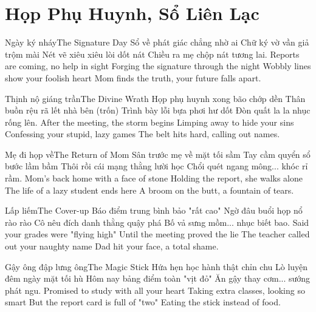 \chapter{Họp Phụ Huynh, Sổ Liên Lạc}

\begin{tutuyetbox}{Ngày ký nháy}{The Signature Day}
Sổ về phát giác chẳng nhờ ai
Chữ ký vờ vần giả trộm mài
Nét vẽ xiêu xiêu lòi dốt nát
Chiều ra mẹ chộp nát tương lai.
\tcblower
Reports are coming, no help in sight 
Forging the signature through the night 
Wobbly lines show your foolish heart 
Mom finds the truth, your future falls apart.
\end{tutuyetbox}

\begin{tutuyetbox}{Thịnh nộ giáng trần}{The Divine Wrath}
Họp phụ huynh xong bão chớp dền
Thân buồn rệu rã lết nhà bên (trốn)
Trình bày lỗi bựa phơi hư dốt
Đòn quất la la nhục rống lên.
\tcblower
After the meeting, the storm begins 
Limping away to hide your sins 
Confessing your stupid, lazy games 
The belt hits hard, calling out names.
\end{tutuyetbox}

\begin{tutuyetbox}{Mẹ đi họp về}{The Return of Mom}
Sân trước mẹ về mặt tối sầm
Tay cầm quyển sổ bước lầm bầm
Thôi rồi cái mạng thằng lười học
Chổi quét ngang mông... khóc rỉ rầm.
\tcblower
Mom's back home with a face of stone
Holding the report, she walks alone
The life of a lazy student ends here
A broom on the butt, a fountain of tears.
\end{tutuyetbox}

\begin{tutuyetbox}{Lấp liếm}{The Cover-up}
Báo điểm trung bình bảo "rất cao"
Ngờ đâu buổi họp nổ rào rào
Cô nêu đích danh thằng quậy phá
Bố vả sưng mồm... nhục biết bao.
\tcblower
Said your grades were "flying high"
Until the meeting proved the lie
The teacher called out your naughty name
Dad hit your face, a total shame.
\end{tutuyetbox}

\begin{tutuyetbox}{Gậy ông đập lưng ông}{The Magic Stick}
Hứa hẹn học hành thật chỉn chu
Lò luyện đêm ngày mặt tối hù
Hôm nay bảng điểm toàn "vịt đỏ"
Ăn gậy thay cơm... sướng phát ngu.
\tcblower
Promised to study with all your heart
Taking extra classes, looking so smart
But the report card is full of "two"
Eating the stick instead of food.
\end{tutuyetbox}

